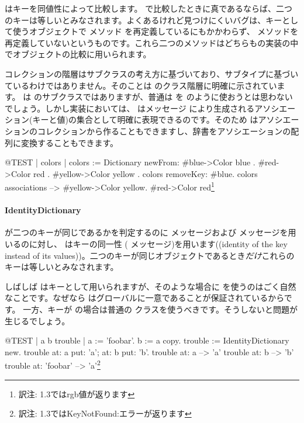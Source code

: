 \documentclass[a4paper,10pt,twoside]{book}
\begin{document}
はキーを同値性によって比較します。 \ct{=} で比較したときに真であるならば、二つのキーは等しいとみなされます。よくあるけれど見つけにくいバグは、キーとして使うオブジェクトで \ct{=}メソッド を再定義しているにもかかわらず、 メソッドを再定義していないというものです。これら二つのメソッドはどちらもの実装の中でオブジェクトの比較に用いられます。

コレクションの階層はサブクラスの考え方に基づいており、サブタイプに基づいているわけではありません。そのことは  のクラス階層に明確に示されています。 は  のサブクラスではありますが、普通は  を  のように使おうとは思わないでしょう。しかし実装においては、 はメッセージ  により生成されるアソシエーション(キーと値)の集合として明確に表現できるのです。そのため  はアソシエーションのコレクションから作ることもできますし、辞書をアソシエーションの配列に変換することもできます。

\begin{code}{@TEST | colors |}
colors := Dictionary newFrom: { #blue->Color blue . #red->Color red . #yellow->Color yellow }.
colors removeKey: #blue.
colors associations --> {#yellow->Color yellow. #red->Color red}\footnote{訳注: \pharo 1.3ではrgb値が返ります}
\end{code}

\paragraph{IdentityDictionary}
 が二つのキーが同じであるかを判定するのに \ct{=} メッセージおよび  メッセージを用いるのに対し、 はキーの同一性 ( メッセージ)を用います((identity of the key instead of its values))。\ie 二つのキーが同じオブジェクトであるとき\emph{だけ}これらのキーは等しいとみなされます。

しばしば  はキーとして用いられますが、そのような場合に を使うのはごく自然なことです。なぜなら  はグローバルに一意であることが保証されているからです。
一方、キーが  の場合は普通の  クラスを使うべきです。そうしないと問題が生じるでしょう。

\begin{code}{@TEST | a b trouble |}
a := 'foobar'.
b := a copy.
trouble := IdentityDictionary new.
trouble at: a put: 'a'; at: b put: 'b'.
trouble at: a          --> 'a'
trouble at: b          --> 'b'
trouble at: 'foobar' --> 'a'\footnote{訳注: \pharo 1.3ではKeyNotFound:エラーが返ります}
\end{code}
\end{document}
